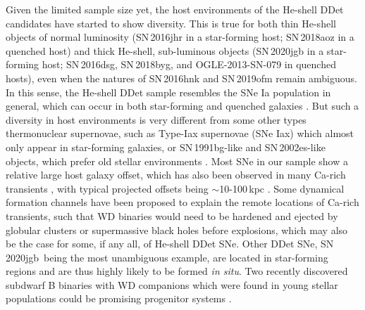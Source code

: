 \documentclass[twocolumn]{aastex631}
\newcommand{\sn}{SN\,2020jgb}
\begin{document}
Given the limited sample size yet, the host environments of the He-shell DDet candidates have started to show diversity. This is true for both thin He-shell objects of normal luminosity (SN\,2016jhr in a star-forming host; SN\,2018aoz in a quenched host) and thick He-shell, sub-luminous objects (SN\,2020jgb in a star-forming host; SN\,2016dsg, SN\,2018byg, and OGLE-2013-SN-079 in quenched hosts), even when the natures of SN\,2016hnk and SN\,2019ofm remain ambiguous. In this sense, the He-shell DDet sample resembles the SNe Ia population in general, which can occur in both star-forming and quenched galaxies \citep[e.g.,][]{Sullivan_2006, Smith_2012}. But such a diversity in host environments is very different from some other types thermonuclear supernovae, such as Type-Iax supernovae (SNe Iax) which almost only appear in star-forming galaxies, or SN\,1991bg-like and SN\,2002es-like objects, which prefer old stellar environments \citep[see the review in][]{Jha_2019}. Most SNe in our sample show a relative large host galaxy offset, which has also been observed in many Ca-rich transients \citep{Lunnan_2017}, with typical projected offsets being $\sim$10-100\,kpc \citep{de_Ca_rich_2020}. Some dynamical formation channels have been proposed to explain the remote locations of Ca-rich transients, such that WD binaries would need to be hardened and ejected by globular clusters \citep{Shen_2019} or supermassive black holes \citep{Foley_2015} before explosions, which may also be the case for some, if any all, of He-shell DDet SNe. Other DDet SNe, \sn\ being the most unambiguous example, are located in star-forming regions and are thus highly likely to be formed {\it in situ}. Two recently discovered subdwarf B binaries with WD companions which were found in young stellar populations could be promising progenitor systems \citep{Geier_2013, Kupfer_2022}.
\end{document}
